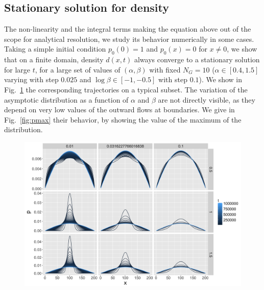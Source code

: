 \subsection*{Stationary solution for density}

The non-linearity and the integral terms making the equation above out of the scope for analytical resolution, we study its behavior numerically in some cases. Taking a simple initial condition $p_0(0)=1$ and $p_0(x)=0$ for $x\neq 0$, we show that on a finite domain, density $d(x,t)$ always converge to a stationary solution for large $t$, for a large set of values of $(\alpha,\beta)$ with fixed $N_G=10$ ($\alpha\in \left[0.4,1.5\right]$ varying with step $0.025$ and $\log\beta \in \left[-1,-0.5\right]$ with step $0.1$). We show in Fig.~\ref{fig:stationary} the corresponding trajectories on a typical subset. The variation of the asymptotic distribution as a function of $\alpha$ and $\beta$ are not directly visible, as they depend on very low values of the outward flows at boundaries. We give in Fig.~\ref{fig:pmax} their behavior, by showing the value of the maximum of the distribution.




\begin{figure}
\centering
\includegraphics[width=\textwidth]{figuresraw/stationary}
\caption{}
\label{fig:stationary}
\end{figure}



